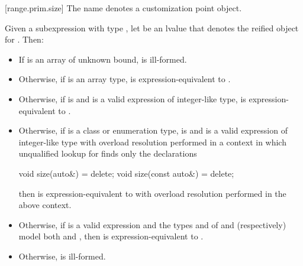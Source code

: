 [range.prim.size]{}
\pnum
The name  denotes a customization point
object.

\pnum
Given a subexpression  with type ,
let  be an lvalue that denotes the reified object for .
Then:

\begin{itemize}
\item
  If  is an array of unknown bound,
   is ill-formed.

\item
  Otherwise, if  is an array type,
   is expression-equivalent to
  .

\item
  Otherwise, if 
  is  and
  is a valid expression of integer-like type,
   is expression-equivalent to
  .

\item
  Otherwise, if  is a class or enumeration type,
   is  and
  is a valid expression of integer-like type
  with overload resolution performed in a context in which
  unqualified lookup for  finds only the declarations
\begin{codeblock}
void size(auto&) = delete;
void size(const auto&) = delete;
\end{codeblock}
  then  is expression-equivalent to
  with overload resolution performed in the above context.

\item
  Otherwise, if
  is a valid expression and
  the types  and  of  and
   (respectively) model both
   and
  ,
  then  is expres\-sion-equivalent to
  .

\item
  Otherwise,  is ill-formed.
\end{itemize}

